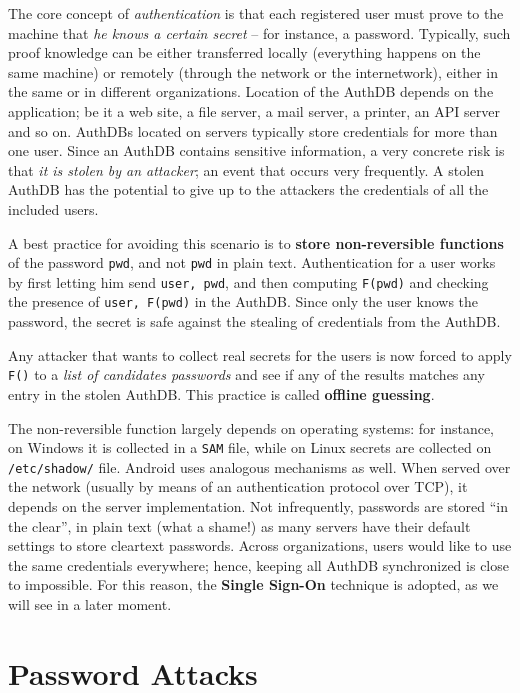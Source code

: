 \documentclass[10pt]{extbook}
\begin{document}
The core concept of \emph{authentication} is that each registered user must
prove to the machine that \emph{he knows a certain secret} -- for instance, a
password. Typically, such proof knowledge can be either transferred locally
(everything happens on the same machine) or remotely (through the network or
the internetwork), either in the same or in different organizations. Location
of the AuthDB depends on the application; be it a web site, a file server, a
mail server, a printer, an API server and so on. AuthDBs located on servers
typically store credentials for more than one user. Since an AuthDB contains
sensitive information, a very concrete risk is that \emph{it is stolen by an
attacker}; an event that occurs very frequently. A stolen AuthDB has the
potential to give up to the attackers the credentials of all the included
users.

A best practice for avoiding this scenario is to \textbf{store non\--reversible
functions} of the password \texttt{pwd}, and not \texttt{pwd} in plain text.
Authentication for a user works by first letting him send \texttt{user, pwd},
and then computing \texttt{F(pwd)} and checking the presence of \texttt{user,
F(pwd)} in the AuthDB. Since only the user knows the password, the secret is
safe against the stealing of credentials from the AuthDB.

Any attacker that wants to collect real secrets for the users is now forced to
apply \texttt{F()} to a \emph{list of candidates passwords} and see if any of
the results matches any entry in the stolen AuthDB. This practice is called
\textbf{offline guessing}.

The non\--reversible function largely depends on operating systems: for
instance, on Windows it is collected in a \texttt{SAM} file, while on Linux
secrets are collected on \texttt{/etc/shadow/} file. Android uses analogous
mechanisms as well. When served over the network (usually by means of an
authentication protocol over TCP), it depends on the server implementation. Not
infrequently, passwords are stored ``in the clear'', in plain text (what a
shame!) as many servers have their default settings to store cleartext
passwords. Across organizations, users would like to use the same credentials
everywhere; hence, keeping all AuthDB synchronized is close to impossible. For
this reason, the \textbf{Single Sign\--On} technique is adopted, as we will see
in a later moment.

\section{Password Attacks}
\end{document}
